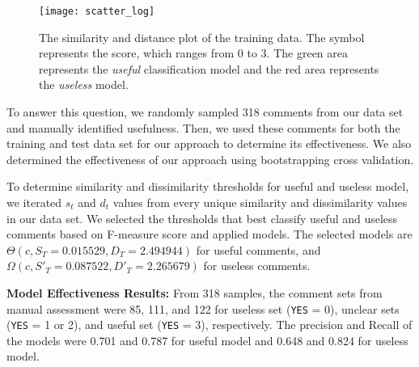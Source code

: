 \begin{figure}[!t]
\centering
\texttt{[image: scatter\_log]}
\caption{The similarity and distance plot of the training data.
The symbol represents the score, which ranges from 0 to 3.
The green area represents the \emph{useful} classification model and the red area represents the \emph{useless} model.}
\label{fig:scatter}
\end{figure}

To answer this question, we randomly sampled 318 comments from our data set and manually identified usefulness.
Then, we used these comments for both the training and test data set for our approach to determine its effectiveness.
We also determined the effectiveness of our approach using bootstrapping cross validation.


%

To determine similarity and dissimilarity thresholds for useful and useless model, we iterated $s_t$ and $d_t$ values from every unique similarity and dissimilarity values in our data set.
We selected the thresholds that best classify useful and useless comments based on F-measure score and applied models.
The selected models are $\Theta(c,S_T=0.015529,D_T=2.494944)$ for useful comments, and $\Omega(c,S'_T=0.087522,D'_T=2.265679)$ for useless comments.




\textbf{Model Effectiveness Results:} From 318 samples, the comment sets from manual assessment were 85, 111, and 122 for useless set (\texttt{YES} = 0), unclear sets (\texttt{YES} = 1 or 2), and useful set (\texttt{YES} = 3), respectively. The precision and Recall of the models were 0.701 and 0.787 for useful model and 0.648 and 0.824 for useless model. 

